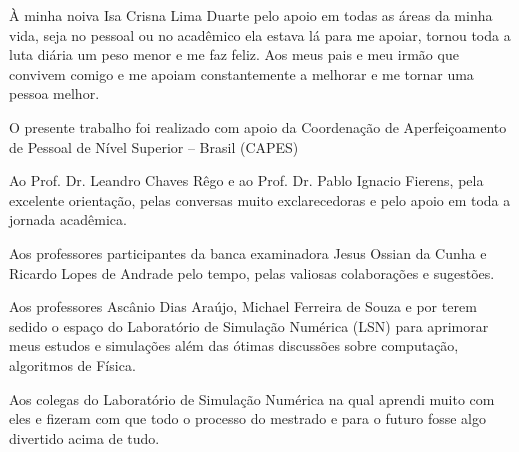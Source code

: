 À minha noiva Isa Crisna Lima Duarte pelo apoio em todas as áreas da minha vida, seja no pessoal ou no acadêmico ela estava lá para me apoiar, tornou toda a luta diária um peso menor e me faz feliz. Aos meus pais e meu irmão que convivem comigo e me apoiam constantemente a melhorar e me tornar uma pessoa melhor.

O presente trabalho foi realizado com apoio da Coordenação de Aperfeiçoamento de Pessoal de Nível Superior – Brasil (CAPES) 

Ao Prof. Dr. Leandro Chaves Rêgo e ao Prof. Dr. Pablo Ignacio Fierens, pela excelente orientação, pelas conversas muito exclarecedoras e pelo apoio em toda a jornada acadêmica.

Aos professores participantes da banca examinadora Jesus Ossian da Cunha e Ricardo Lopes de Andrade pelo tempo, pelas valiosas colaborações e sugestões.

Aos professores Ascânio Dias Araújo, Michael Ferreira de Souza e por terem sedido o espaço do Laboratório de Simulação Numérica (LSN) para aprimorar meus estudos e simulações além das ótimas discussões sobre computação, algoritmos de Física.

Aos colegas do Laboratório de Simulação Numérica na qual aprendi muito com eles e fizeram com que todo o processo do mestrado e para o futuro fosse algo divertido acima de tudo.